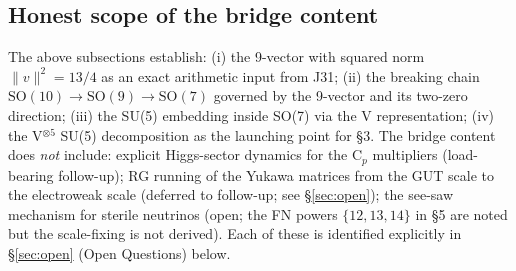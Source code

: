 \subsection{Honest scope of the bridge content}
\label{subsec:scope}

The above subsections establish: (i) the 9-vector with squared norm
$\|v\|^2 = 13/4$ as an exact arithmetic input from J31; (ii) the
breaking chain $\mathrm{SO}(10) \to \mathrm{SO}(9) \to \mathrm{SO}(7)$ governed by the 9-vector
and its two-zero direction; (iii) the SU(5) embedding inside SO(7) via
the V representation; (iv) the V$^{\otimes 5}$ SU(5) decomposition as
the launching point for §3. The bridge content does \emph{not}
include: explicit Higgs-sector dynamics for the C$_p$ multipliers
(load-bearing follow-up); RG running of the Yukawa matrices from the
GUT scale to the electroweak scale (deferred to follow-up; see
§\ref{sec:open}); the see-saw mechanism for sterile neutrinos (open;
the FN powers $\{12, 13, 14\}$ in §5 are noted but the scale-fixing is
not derived). Each of these is identified explicitly in
§\ref{sec:open} (Open Questions) below.

